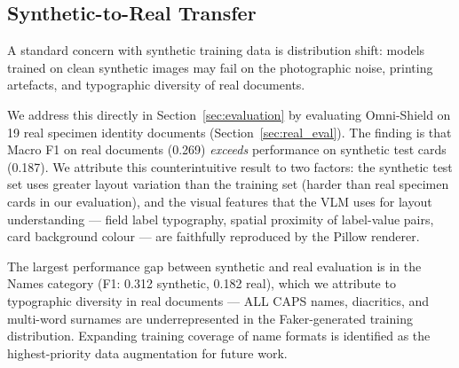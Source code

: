 \subsection{Synthetic-to-Real Transfer}

A standard concern with synthetic training data is
distribution shift: models trained on clean synthetic
images may fail on the photographic noise, printing
artefacts, and typographic diversity of real documents.

We address this directly in Section~\ref{sec:evaluation}
by evaluating Omni-Shield on 19 real specimen identity
documents (Section~\ref{sec:real_eval}).
The finding is that Macro F1 on real documents
(0.269) \emph{exceeds} performance on synthetic test
cards (0.187).
We attribute this counterintuitive result to two
factors: the synthetic test set uses greater layout
variation than the training set (harder than real
specimen cards in our evaluation), and the visual
features that the VLM uses for layout understanding
--- field label typography, spatial proximity of
label-value pairs, card background colour --- are
faithfully reproduced by the Pillow renderer.

The largest performance gap between synthetic and
real evaluation is in the Names category
(F1: 0.312 synthetic, 0.182 real), which we
attribute to typographic diversity in real documents
--- ALL CAPS names, diacritics, and multi-word
surnames are underrepresented in the Faker-generated
training distribution.
Expanding training coverage of name formats is
identified as the highest-priority data augmentation
for future work.
